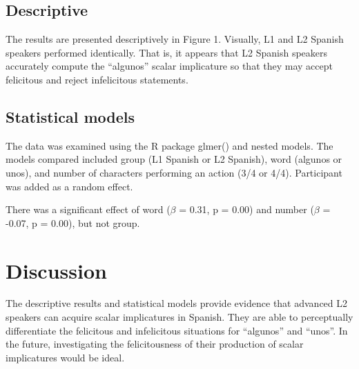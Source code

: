 \documentclass[
  man]{apa6}
\begin{document}
\hypertarget{descriptive}{%
\subsection{Descriptive}\label{descriptive}}

The results are presented descriptively in Figure 1. Visually, L1 and L2 Spanish speakers performed identically. That is, it appears that L2 Spanish speakers accurately compute the ``algunos'' scalar implicature so that they may accept felicitous and reject infelicitous statements.

\hypertarget{statistical-models}{%
\subsection{Statistical models}\label{statistical-models}}

The data was examined using the R package glmer() and nested models. The models compared included group (L1 Spanish or L2 Spanish), word (algunos or unos), and number of characters performing an action (3/4 or 4/4). Participant was added as a random effect.

There was a significant effect of word (\(\beta\) = 0.31, p = 0.00) and number (\(\beta\) = -0.07, p = 0.00), but not group.

\hypertarget{discussion}{%
\section{Discussion}\label{discussion}}

The descriptive results and statistical models provide evidence that advanced L2 speakers can acquire scalar implicatures in Spanish. They are able to perceptually differentiate the felicitous and infelicitous situations for ``algunos'' and ``unos''. In the future, investigating the felicitousness of their production of scalar implicatures would be ideal.
\end{document}
